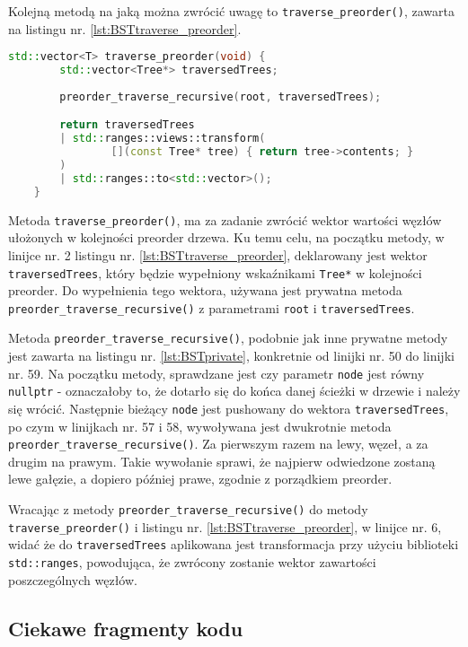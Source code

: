 Kolejną metodą na jaką można zwrócić uwagę to \texttt{traverse\_preorder()}, zawarta na listingu nr. \ref{lst:BSTtraverse_preorder}. 

\begin{lstlisting}[caption=Metoda \texttt{add()}, label={lst:BSTtraverse_preorder}, language=C++]
	std::vector<T> traverse_preorder(void) {
		std::vector<Tree*> traversedTrees;
	
		preorder_traverse_recursive(root, traversedTrees);

		return traversedTrees 
		| std::ranges::views::transform(
				[](const Tree* tree) { return tree->contents; }
		) 
		| std::ranges::to<std::vector>(); 
	}

\end{lstlisting}

Metoda \texttt{traverse\_preorder()}, ma za zadanie zwrócić wektor wartości węzłów ułożonych w kolejności preorder drzewa. Ku temu celu, na początku metody, w linijce nr. 2 listingu nr. \ref{lst:BSTtraverse_preorder}, deklarowany jest wektor \texttt{traversedTrees}, który będzie wypełniony wskaźnikami \texttt{Tree*} w kolejności preorder. Do wypełnienia tego wektora, używana jest prywatna metoda \texttt{preorder\_traverse\_recursive()} z parametrami \texttt{root} i \texttt{traversedTrees}.

Metoda \texttt{preorder\_traverse\_recursive()}, podobnie jak inne prywatne metody jest zawarta na listingu nr. \ref{lst:BSTprivate}, konkretnie od linijki nr. 50 do linijki nr. 59. Na początku metody, sprawdzane jest czy parametr \texttt{node} jest równy \texttt{nullptr} - oznaczałoby to, że dotarło się do końca danej ścieżki w drzewie i należy się wrócić. Następnie bieżący \texttt{node} jest pushowany do wektora \texttt{traversedTrees}, po czym w linijkach nr. 57 i 58, wywoływana jest dwukrotnie metoda \texttt{preorder\_traverse\_recursive()}. Za pierwszym razem na lewy, węzeł, a za drugim na prawym. Takie wywołanie sprawi, że najpierw odwiedzone zostaną lewe gałęzie, a dopiero później prawe, zgodnie z porządkiem preorder.

Wracając z metody \texttt{preorder\_traverse\_recursive()} do metody \texttt{traverse\_preorder()} i listingu nr. \ref{lst:BSTtraverse_preorder}, w linijce nr. 6, widać że do \texttt{traversedTrees} aplikowana jest transformacja przy użyciu biblioteki \texttt{std::ranges}, powodująca, że zwrócony zostanie wektor zawartości poszczególnych węzłów. 

\subsection{Ciekawe fragmenty kodu}
